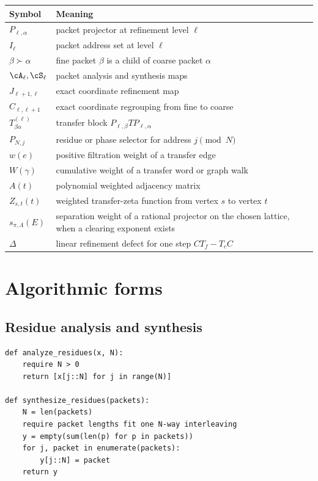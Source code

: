 \begin{longtable}{L{0.28\textwidth}L{0.64\textwidth}}
\toprule
Symbol & Meaning \\
\midrule
\endhead
$P_{\ell,\alpha}$ & packet projector at refinement level $\ell$ \\
$I_\ell$ & packet address set at level $\ell$ \\
$\beta\succ\alpha$ & fine packet $\beta$ is a child of coarse packet $\alpha$ \\
$\cA_\ell,\cS_\ell$ & packet analysis and synthesis maps \\
$J_{\ell+1,\ell}$ & exact coordinate refinement map \\
$C_{\ell,\ell+1}$ & exact coordinate regrouping from fine to coarse \\
$T^{(\ell)}_{\beta\alpha}$ & transfer block $P_{\ell,\beta}TP_{\ell,\alpha}$ \\
$P_{N,j}$ & residue or phase selector for address $j\pmod N$ \\
$w(e)$ & positive filtration weight of a transfer edge \\
$W(\gamma)$ & cumulative weight of a transfer word or graph walk \\
$A(t)$ & polynomial weighted adjacency matrix \\
$Z_{s,t}(t)$ & weighted transfer-zeta function from vertex $s$ to vertex $t$ \\
$s_{\pi,\Lambda}(E)$ & separation weight of a rational projector on the chosen lattice, when a clearing exponent exists \\
$\Delta$ & linear refinement defect for one step $CT_f-T_cC$ \\
\bottomrule
\end{longtable}

\section{Algorithmic forms}\label{sec:algorithms}

\subsection{Residue analysis and synthesis}\label{alg:residue}

\begin{lstlisting}
def analyze_residues(x, N):
    require N > 0
    return [x[j::N] for j in range(N)]

def synthesize_residues(packets):
    N = len(packets)
    require packet lengths fit one N-way interleaving
    y = empty(sum(len(p) for p in packets))
    for j, packet in enumerate(packets):
        y[j::N] = packet
    return y
\end{lstlisting}

